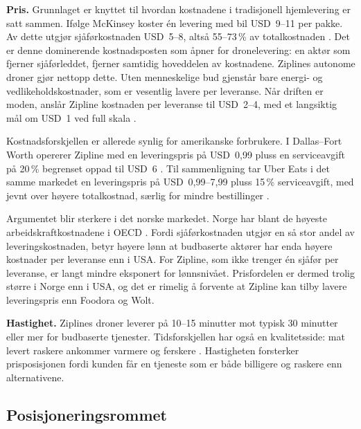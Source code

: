 \documentclass[12pt, a4paper]{article}
\begin{document}
\textbf{Pris.}
Grunnlaget er knyttet til hvordan kostnadene i tradisjonell hjemlevering er
satt sammen. Ifølge McKinsey koster én levering med bil USD~9--11 per pakke.
Av dette utgjør sjåførkostnaden USD~5--8, altså 55--73\,\% av totalkostnaden
\parencite{dronexl2026}. Det er denne dominerende kostnadsposten som åpner
for dronelevering: en aktør som fjerner sjåførleddet, fjerner samtidig
hoveddelen av kostnadene. Ziplines autonome droner gjør nettopp dette. Uten
menneskelige bud gjenstår bare energi- og vedlikeholdskostnader, som er
vesentlig lavere per leveranse. Når driften er moden, anslår Zipline
kostnaden per leveranse til USD~2--4, med et langsiktig mål om USD~1 ved full
skala \parencite{logisticsnavigators2026, dronexl2026}.

Kostnadsforskjellen er allerede synlig for amerikanske forbrukere.
I Dallas--Fort Worth opererer Zipline med en leveringspris på USD~0,99 pluss
en
serviceavgift på 20\,\% begrenset oppad til USD~6 \parencite{stevens2025}. Til
sammenligning tar Uber Eats i det samme markedet en leveringspris på
USD~0,99--7,99 pluss 15\,\% serviceavgift, med jevnt over høyere
totalkostnad, særlig for mindre bestillinger \parencite{ubereats2026}.

Argumentet blir sterkere i det norske markedet. Norge har blant de høyeste
arbeidskraftkostnadene i OECD \parencite{ssb2024}. Fordi sjåførkostnaden
utgjør en så stor andel av leveringskostnaden, betyr høyere lønn at
budbaserte aktører har enda høyere kostnader per leveranse enn i USA. For
Zipline, som ikke trenger én sjåfør per leveranse, er langt mindre eksponert
for lønnsnivået. Prisfordelen er dermed trolig større i Norge enn i
USA, og det er rimelig å forvente at Zipline kan tilby lavere leveringspris
enn Foodora og Wolt.

\textbf{Hastighet.}
Ziplines droner leverer på 10–15 minutter mot typisk 30 minutter eller mer for
budbaserte tjenester. Tidsforskjellen har også en kvalitetsside: mat levert
raskere ankommer
varmere og ferskere \parencite{stevens2025}. Hastigheten forsterker
prisposisjonen fordi kunden får en tjeneste som er både billigere og raskere
enn alternativene.

\subsection{Posisjoneringsrommet}
\end{document}
